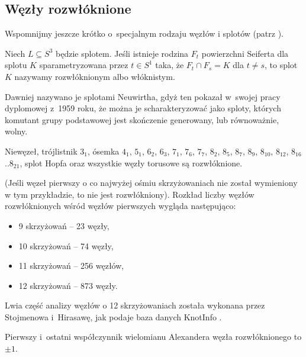 
\subsection{Węzły rozwłóknione}
%
%
Wspomnijmy jeszcze krótko o~specjalnym rodzaju węzłów i splotów (patrz \cite[s. 49-50]{kawauchi96}).

\begin{definition}
    Niech $L \subseteq S^3$ będzie splotem.
    Jeśli istnieje rodzina $F_t$ powierzchni Seiferta dla splotu $K$ sparametryzowana przez $t \in S^1$ taka, że $F_t \cap F_s = K$ dla $t \neq s$, to splot $K$ nazywamy rozwłóknionym albo włóknistym.
\end{definition}

%
Dawniej nazywano je splotami Neuwirtha, gdyż ten pokazał w~swojej pracy dyplomowej z~1959 roku, że można je scharakteryzować jako sploty, których komutant grupy podstawowej jest skończenie generowany, lub równoważnie, wolny.

\begin{example}
    Niewęzeł, trójlistnik $3_1$, ósemka $4_1$, $5_{1}$, $6_{2}$, $6_{3}$, $7_{1}$, $7_{6}$, $7_{7}$, $8_{2}$, $8_{5}$, $8_{7}$, $8_{9}$, $8_{10}$, $8_{12}$, $8_{16}$..$8_{21}$, splot Hopfa oraz wszystkie węzły torusowe są rozwłóknione.
\end{example}

(Jeśli węzeł pierwszy o co najwyżej ośmiu skrzyżowaniach nie został wymieniony w tym przykładzie, to nie jest rozwłókniony).
Rozkład liczby węzłów rozwłóknionych wśród węzłów pierwszych wygląda następująco:
\begin{itemize}
\item 9 skrzyżowań -- 23 węzły,
\item 10 skrzyżowań -- 74 węzły,
\item 11 skrzyżowań -- 256 węzłów,
\item 12 skrzyżowań -- 873 węzły.
\end{itemize}

Lwia część analizy węzłów o 12 skrzyżowaniach została wykonana przez Stojmenowa i~Hirasawę, jak podaje baza danych KnotInfo \cite{knotinfo22}.
%
%

\begin{proposition}
%
    Pierwszy i~ostatni współczynnik wielomianu Alexandera węzła rozwłóknionego to $\pm 1$.
\end{proposition}

